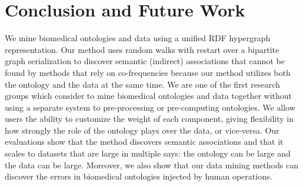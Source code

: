 \section{Conclusion and Future Work}
\label{sec:conclusion}

%

We mine biomedical ontologies and  data using a unified RDF hypergraph representation.  Our method uses random walks with restart over a bipartite graph serialization to discover semantic (indirect) associations that cannot be found by methods that rely on co-frequencies because our method utilizes both the ontology and the data at the same time. We are one of the first research groups which consider to mine biomedical ontologies and data together without using a separate system to pre-processing or pre-computing ontologies. We allow users the ability to customize the weight of each component, giving flexibility in how strongly the role of the ontology plays over the data, or vice-versa.  Our evaluations show that the method discovers semantic associations and that it scales to datasets that are large in multiple says: the ontology can be large and the data can be large. Moreover, we also show that our data mining methods can discover the errors in biomedical ontologies injected by human operations.

